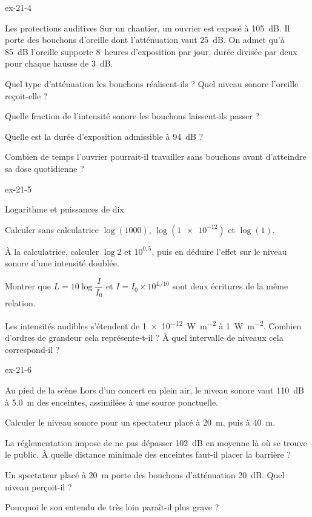 \begin{blocLivre}{ex-21-4}
\begin{exercice}[1]{Les protections auditives}
Sur un chantier, un ouvrier est exposé à \qty{105}{dB}. Il porte des bouchons d'oreille dont l'atténuation vaut
\qty{25}{dB}. On admet qu'à \qty{85}{dB} l'oreille supporte 8~heures d'exposition par jour, durée divisée par deux pour
chaque hausse de \qty{3}{dB}.
\begin{questions}
\item Quel type d'atténuation les bouchons réalisent-ils ? Quel niveau sonore l'oreille reçoit-elle ?
\item Quelle fraction de l'intensité sonore les bouchons laissent-ils passer ?
\item Quelle est la durée d'exposition admissible à \qty{94}{dB} ?
\item Combien de temps l'ouvrier pourrait-il travailler sans bouchons avant d'atteindre sa dose quotidienne ?
\end{questions}
\end{exercice}
\end{blocLivre}
\begin{blocLivre}{ex-21-5}
\begin{exercice}[1]{Logarithme et puissances de dix}
\begin{questions}
\item Calculer sans calculatrice $\log(1000)$, $\log(\num{1e-12})$ et $\log(1)$.
\item À la calculatrice, calculer $\log2$ et $10^{0{,}5}$, puis en déduire l'effet sur le niveau sonore d'une
intensité doublée.
\item Montrer que $L=10\log\dfrac{I}{I_0}$ et $I=I_0\times10^{L/10}$ sont deux écritures de la même relation.
\item Les intensités audibles s'étendent de \qty{1e-12}{W.m^{-2}} à \qty{1}{W.m^{-2}}. Combien d'ordres de grandeur cela
représente-t-il ? À quel intervalle de niveaux cela correspond-il ?
\end{questions}
\end{exercice}
\end{blocLivre}
\begin{blocLivre}{ex-21-6}
\begin{exercice}[2]{Au pied de la scène}
Lors d'un concert en plein air, le niveau sonore vaut \qty{110}{dB} à \qty{5,0}{m} des enceintes, assimilées à une source
ponctuelle.
\begin{questions}
\item Calculer le niveau sonore pour un spectateur placé à \qty{20}{m}, puis à \qty{40}{m}.
\item La réglementation impose de ne pas dépasser \qty{102}{dB} en moyenne là où se trouve le public. À quelle distance
minimale des enceintes faut-il placer la barrière ?
\item Un spectateur placé à \qty{20}{m} porte des bouchons d'atténuation \qty{20}{dB}. Quel niveau perçoit-il ?
\item Pourquoi le son entendu de très loin paraît-il plus grave ?
\end{questions}
\end{exercice}
\end{blocLivre}
